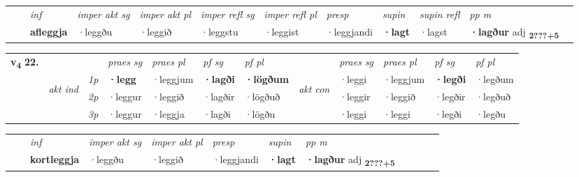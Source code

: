 \begin{tabular}{llllllllllll}
 & & \textit{inf} & \textit{imper akt sg} & \textit{imper akt pl} & \textit{imper refl sg} & \textit{imper refl pl} & \textit{presp} & \textit{supin} & \textit{supin refl} & \textit{pp m}     \\*
  & & \textbf{afleggja} & ·leggðu  & ·leggið & ·leggstu & ·leggist & ·leggjandi &  \textbf{·lagt} & ·lagst & \textbf{·lagður} adj \textbf{\textsubscript{2???+5}} \\*
\cmidrule{1-12}
\end{tabular}



\begin{tabular}{llllllllllll} \toprule
\multirow{4}{*}{{{\textbf{v{\textsubscript{4}}} \Large{\textbf{22.}}}}}  & &   &  \textit{praes sg}  & \textit{praes pl}  &\textit{ pf sg} & \textit{pf pl} &  &  \textit{praes sg}  & \textit{praes pl}  & \textit{pf sg} & \textit{pf pl } \\*
	\cmidrule{4-7} \cmidrule{9-12}
 & \multirow{3}{*}{\begin{turn}{90}\textit{akt ind}\end{turn}} & {\textit{1p}} & \textbf{·legg} & ·leggjum    & \textbf{·lagði} & \textbf{·lögðum} & \multirow{3}{*}{\begin{turn}{90}\textit{akt con}\end{turn}} &·leggi & ·leggjum & \textbf{·legði} & ·legðum\\*
& &  {\textit{2p}} &  ·leggur  & ·leggið   & ·lagðir & ·lögðuð & & ·leggir & ·leggið & ·legðir & ·legðuð \\*
& &  {\textit{3p}} & ·leggur & ·leggja   & ·lagði & ·lögðu & & ·leggi & ·leggi& ·legði & ·legðu  \\*
\cmidrule{4-7} \cmidrule{9-12}
\end{tabular}


\begin{tabular}{llllllllllll}
 & & \textit{inf} & \textit{imper akt sg} & \textit{imper akt pl}   & \textit{presp} & \textit{supin}  & \textit{pp m}     \\*
  & & \textbf{kortleggja} & ·leggðu  & ·leggið   & ·leggjandi &  \textbf{·lagt}  & \textbf{·lagður} adj \textbf{\textsubscript{2???+5}} \\*
\cmidrule{1-12}
\end{tabular}



